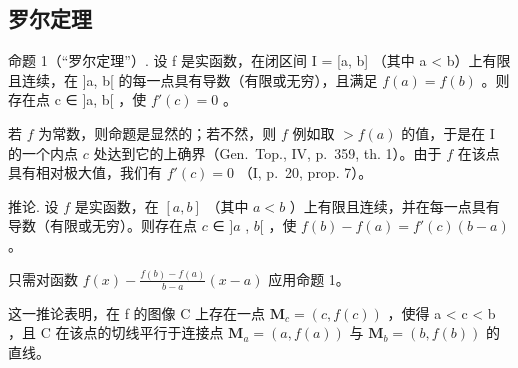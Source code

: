 \subsection{罗尔定理}

命题 1（“罗尔定理”）. 设 f 是实函数，在闭区间 I = {[}a, b{]} （其中 a \textless{} b）上有限且连续，在 {]}a, b{[} 的每一点具有导数（有限或无穷），且满足 \(f(a) = f(b)\) 。则存在点 c ∈ {]}a, b{[} ，使 \(f'(c) = 0\) 。

若 \(f\) 为常数，则命题是显然的；若不然，则 \(f\) 例如取 \(> f(a)\) 的值，于是在 I 的一个内点 \(c\) 处达到它的上确界（Gen.~Top., IV, p.~359, th. 1）。由于 \(f\) 在该点具有相对极大值，我们有 \(f'(c) = 0\) （I, p.~20, prop. 7）。

推论. 设 \(f\) 是实函数，在 \([a, b]\) （其中 \(a < b\) ）上有限且连续，并在每一点具有导数（有限或无穷）。则存在点 \(c\) ∈ \(]a\) , \(b[\) ，使 \(f(b) - f(a) = f'(c)(b - a)\) 。

只需对函数 \(f(x) - \frac{f(b) - f(a)}{b - a} (x - a)\) 应用命题 1。

这一推论表明，在 f 的图像 C 上存在一点 \(\mathbf{M}_{c} = (c, f(c))\) ，使得 a \textless{} c \textless{} b ，且 C 在该点的切线平行于连接点 \(\mathbf{M}_{a} = (a, f(a))\) 与 \(\mathbf{M}_{b} = (b, f(b))\) 的直线。

